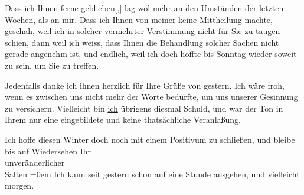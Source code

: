 \pstart
           Dass \uline{ich} Ihnen ferne geblieben{[},{]}
               lag wol mehr an den Umständen der letzten Wochen, als an mir. Dass ich Ihnen von
               meiner \label{K_L03132-5v}\label{K_L03132-5h} keine Mittheilung
               machte, geschah, weil ich in solcher vermehrter {\pb}Verstimmung nicht für Sie zu
               taugen schien, dann weil ich weiss, dass Ihnen die Behandlung solcher Sachen nicht
               gerade angenehm ist, und endlich, weil ich doch hoffte bis Sonntag wieder soweit zu sein, um Sie zu treffen.\pend
           
\pstart
           Jedenfalls danke ich ihnen herzlich für Ihre Grüße von gestern. Ich wäre froh, wenn es zwischen uns nicht mehr der Worte
               bedürfte, um uns unserer Gesinnung zu versichern.
               Vielleicht bin \uline{ich} übrigens diesmal Schuld, und war
               der Ton in Ihrem \label{K_L03132-6v}\label{K_L03132-6h} nur eine eingebildete
               und keine thatsächliche Veranlaßung.\pend
           
\pstart
           Ich hoffe diesen Winter doch noch mit einem Positivum zu schließen, und bleibe
               bis auf Wiedersehen Ihr {\\[\baselineskip]}unveränderlicher {\\[\baselineskip]}\spacefill\mbox{Salten}\pend
           \leftskip=0em{}
\pstart
           \noindent{}Ich kann seit gestern schon auf eine Stunde
                  ausgehen, und \label{K_L03132-7v}\label{K_L03132-7h} vielleicht morgen.\pend
           \endnumbering{}  
      